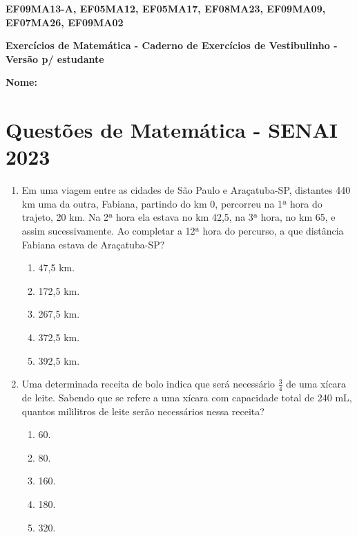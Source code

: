 \documentclass[a4paper,14pt]{article}
\begin{document}
	
	\noindent\textbf{EF09MA13-A, EF05MA12, EF05MA17, EF08MA23, EF09MA09, EF07MA26, EF09MA02}
	
	\begin{center}
		\textbf{Exercícios de Matemática - Caderno de Exercícios de Vestibulinho - Versão p/ estudante}
	\end{center}
	
	\bigskip
	
	\noindent\textbf{Nome:} \underline{\hspace{15cm}}
	
	\bigskip
	\section*{Questões de Matemática - SENAI 2023}
	
	\begin{enumerate}
		\item Em uma viagem entre as cidades de São Paulo e Araçatuba-SP, distantes 440 km uma da outra, Fabiana,
		partindo do km 0, percorreu na 1ª hora do trajeto, 20 km. Na 2ª hora ela estava no km 42,5, na 3ª hora,
		no km 65, e assim sucessivamente. 
		\newline
		Ao completar a 12ª hora do percurso, a que distância Fabiana estava de Araçatuba-SP?
		\begin{enumerate}
			\item 47,5 km.
			\item 172,5 km.
			\item 267,5 km.
			\item 372,5 km.
			\item 392,5 km.
		\end{enumerate}
		\vspace{1cm}
	    
	    \item Uma determinada receita de bolo indica que será necessário \(\frac{3}{4}\)
	    de uma xícara de leite. Sabendo que se
	    refere a uma xícara com capacidade total de 240 mL, quantos mililitros de leite serão necessários nessa
	    receita?
	    \begin{enumerate}
	    	\item 60.
	    	\item 80.
	    	\item 160.
	    	\item 180.
	    	\item 320.
	    \end{enumerate}
	    \vspace{4cm}
	    

\end{enumerate}
\end{document}
